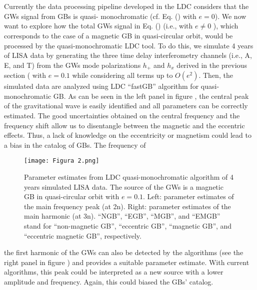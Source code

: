 \documentclass[a4paper,10.5pt]{article}
\begin{document}
\thispagestyle{empty}
\section{}

Currently the data processing pipeline developed in the LDC considers that the GWs signal from GBs is quasi- monochromatic (cf. Eq. () with $e=0$). We now want to explore how the total GWs signal in Eq. () (i.e., with $e\not=0$ ), which corresponds to the case of a magnetic GB in quasi-circular orbit, would be processed by the quasi-monochromatic LDC tool. To do this, we simulate 4 years of LISA data by generating the three time delay interferometry channels (i.e., A, E, and T) from the GWs mode polarizations $h_+$ and $h_x$ derived in the previous section ( with $e=0.1$ while considering all terms up to $O(e^2)$. Then, the simulated data are analyzed using LDC “fastGB” algorithm for quasi-monochromatic GB.
As can be seen in the left panel in figure , the central peak of the gravitational wave is easily identified and all parameters can be correctly estimated. The good uncertainties obtained on the central frequency and the frequency shift allow us to disentangle between the magnetic and the eccentric effects. Thus, a lack of knowledge on the eccentricity or magnetism could lead to a bias in the catalog of GBs. The frequency of\vspace{1mm}  
\begin{figure}[H]
    \centering
    \texttt{[image: Figura 2.png]}
    \caption{Parameter estimates from LDC quasi-monochromatic algorithm of 4 years simulated LISA data. The source of the GWs is a magnetic GB in quasi-circular orbit with $e = 0.1$. Left: parameter estimates of the main frequency peak (at 2n). Right: parameter estimates of the main harmonic (at 3n). “NGB”, “EGB”, “MGB”, and “EMGB” stand for “non-magnetic GB”, “eccentric GB”, “magnetic GB”, and “eccentric magnetic GB”, respectively.
}
    \label{Figura 2}
\end{figure} \vspace{1mm} 
the first harmonic of the GWs can also be detected by the algorithms (see the right panel in figure ) and provides a suitable parameter estimate. With current algorithms, this peak could be interpreted as a new source with a lower amplitude and frequency. Again, this could biased the GBs’ catalog.
\thispagestyle{empty}
\end{document}
